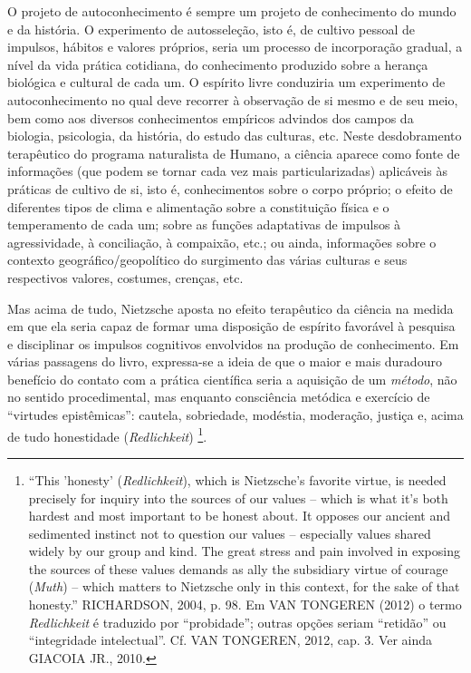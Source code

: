 \documentclass[
	12pt,				%
	openright,			%
	oneside,			%
	a4paper,			%
	english,			%
	french,				%
	spanish,			%
	brazil				%
	]{abntex2}
\begin{document}
	O projeto de autoconhecimento é sempre um projeto de conhecimento do mundo e da história.	O experimento de autosseleção, isto é, de cultivo pessoal de impulsos, hábitos e valores próprios, seria um processo de incorporação gradual, a nível da vida prática cotidiana, do conhecimento produzido sobre a herança biológica e cultural de cada um. O espírito livre conduziria um experimento de autoconhecimento no qual deve recorrer à observação de si mesmo e de seu meio, bem como aos diversos conhecimentos empíricos advindos dos campos da biologia, psicologia, da história, do estudo das culturas, etc. Neste desdobramento terapêutico do programa naturalista de Humano, a ciência aparece como fonte de informações (que podem se tornar cada vez mais particularizadas) aplicáveis às práticas de cultivo de si, isto é, conhecimentos sobre o corpo próprio; o efeito de diferentes tipos de clima e alimentação sobre a constituição física e o temperamento de cada um; sobre as funções adaptativas de impulsos à agressividade, à conciliação, à compaixão, etc.; ou ainda, informações sobre o contexto geográfico/geopolítico do surgimento das várias culturas e seus respectivos valores, costumes, crenças, etc. 

Mas acima de tudo, Nietzsche aposta no efeito terapêutico da ciência na medida em que ela seria capaz de formar uma disposição de espírito favorável à pesquisa e disciplinar os impulsos cognitivos envolvidos na produção de conhecimento. Em várias passagens do livro, expressa-se a ideia de que o maior e mais duradouro benefício do contato com a prática científica seria a aquisição de um \textit{método}, não no sentido procedimental, mas enquanto consciência metódica e exercício de “virtudes epistêmicas”: cautela, sobriedade, modéstia, moderação, justiça e, acima de tudo honestidade (\textit{Redlichkeit})
\footnote{“This 'honesty' (\textit{Redlichkeit}), which is Nietzsche's favorite virtue, is needed precisely for inquiry into the sources of our values – which is what it's both hardest and most important to be honest about. It opposes our ancient and sedimented instinct not to question our values – especially values shared widely by our group and kind. The great stress and pain involved in exposing the sources of these values demands as ally the subsidiary virtue of courage (\textit{Muth}) – which matters to Nietzsche only in this context, for the sake of that honesty.” RICHARDSON, 2004, p. 98. Em VAN TONGEREN (2012) o termo \textit{Redlichkeit} é traduzido por “probidade”; outras opções seriam “retidão” ou “integridade intelectual”. Cf. VAN TONGEREN, 2012, cap. 3. Ver ainda GIACOIA JR., 2010.}. 
\end{document}
